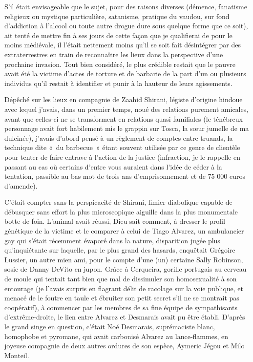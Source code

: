 S’il était envisageable que le sujet, pour des raisons diverses (démence, fanatisme religieux ou mystique particulière, satanisme, pratique du vaudou, sur fond d’addiction à l’alcool ou toute autre drogue dure sous quelque forme que ce soit), ait tenté de mettre fin à ses jours de cette façon que je qualifierai de pour le moins médiévale, il l’était nettement moins qu’il se soit fait désintégrer par des extraterrestres en train de reconnaître les lieux dans la perspective d’une prochaine invasion. Tout bien considéré, le plus crédible restait que le pauvre avait été la victime d’actes de torture et de barbarie de la part d’un ou plusieurs individus qu’il restait à identifier et punir à la hauteur de leurs agissements.

Dépêché sur les lieux en compagnie de Zaahid Shirani, légiste d’origine hindoue avec lequel j’avais, dans un premier temps, noué des relations purement amicales, avant que celles-ci ne se transforment en relations quasi familiales (le ténébreux personnage avait fort habilement mis le grappin sur Tosca, la sœur jumelle de ma dulcinée), j’avais d’abord pensé à un règlement de comptes entre truands, la technique dite «~du barbecue~» étant souvent utilisée par ce genre de clientèle pour tenter de faire entrave à l’action de la justice (infraction, je le rappelle en passant au cas où certains d’entre vous auraient dans l’idée de céder à la tentation, passible au bas mot de trois ans d’emprisonnement et de 75 000 euros d’amende).

C’était compter sans la perspicacité de Shirani, limier diabolique capable de débusquer sans effort la plus microscopique aiguille dans la plus monumentale botte de foin. L’animal avait réussi, Dieu sait comment, à dresser le profil génétique de la victime et le comparer à celui de Tiago Alvarez, un ambulancier gay qui s’était récemment évaporé dans la nature, disparition jugée plus qu’inquiétante sur laquelle, par le plus grand des hasards, enquêtait Grégoire Lussier, un autre mien ami, pour le compte d’une (un) certaine Sally Robinson, sosie de Danny DeVito en jupon. Grâce à Cerqueira, gorille portugais au cerveau de moule qui tentait tant bien que mal de dissimuler son homosexualité à son entourage (je l’avais surpris en flagrant délit de racolage sur la voie publique, et menacé de le foutre en taule et ébruiter son petit secret s’il ne se montrait pas coopératif), à commencer par les membres de sa fine équipe de sympathisants d’extrême-droite, le lien entre Alvarez et Desmarais avait pu être établi. D’après le grand singe en question, c’était Noé Desmarais, suprémaciste blanc, homophobe et pyromane, qui avait carbonisé Alvarez au lance-flammes, en joyeuse compagnie de deux autres ordures de son espèce, Aymeric Jégou et Milo Monteil.

